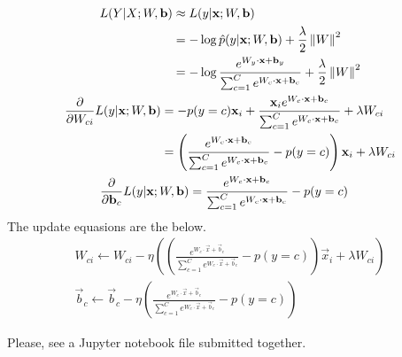 \documentclass{introtosml}
\newcommand{\x}{\vec{x}}
\newcommand{\bb}{\vec{b}}
\begin{document}
\begin{p}
  \item
    \begin{gather*}
      \begin{aligned}
        L(Y|X; W, \bb)
        & \approx L(y|\x; W, \bb) \\
        & = - \log \hat{p}(y|\x; W, \bb) + \frac{\lambda}{2} \norm{W}^2 \\
        & = - \log \frac{e^{W_y \cdot \x + \bb_y}}{\sum_{c=1}^C e^{W_c \cdot \x + \bb_c}}
            + \frac{\lambda}{2} \norm{W}^2
      \end{aligned} \\
      \begin{aligned}
        \frac{\partial}{\partial W_{ci}} L(y|\x; W, \bb)
        & = - p(y=c) \x_i + \frac{\x_i e^{W_c \cdot \x + \bb_c}}
                                 {\sum_{c=1}^C e^{W_c \cdot \x + \bb_c}}
            + \lambda W_{ci} \\
        & = \left(\frac{e^{W_c \cdot \x + \bb_c}}{\sum_{c=1}^C e^{W_c \cdot \x + \bb_c}}
            - p(y=c)\right) \x_i + \lambda W_{ci}
      \end{aligned} \\
      \begin{aligned}
        \frac{\partial}{\partial \bb_{c}} L(y|\x; W, \bb)
        & = \frac{e^{W_c \cdot \x + \bb_c}}{\sum_{c=1}^C e^{W_c \cdot \x + \bb_c}} - p(y=c)
      \end{aligned} \\
    \end{gather*}
    \therefore The update equasions are the below.
    \begin{gather*}
      W_{ci} \leftarrow W_{ci} - \eta
      \left(\left(\frac{e^{W_c \cdot \x + \bb_c}}{\sum_{c=1}^C e^{W_c \cdot \x + \bb_c}}
            - p(y=c)\right) \x_i + \lambda W_{ci}\right) \\
      \bb_c \leftarrow \bb_c - \eta
      \left( \frac{e^{W_c \cdot \x + \bb_c}}
                  {\sum_{c=1}^C e^{W_c \cdot \x + \bb_c}} - p(y=c)\right)
    \end{gather*}

  \item
    Please, see a Jupyter notebook file submitted together.
\end{p}
\end{document}
